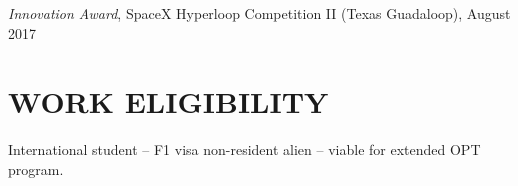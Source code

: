 \documentclass[11pt]{res}
\begin{document}
\begin{resume}
	\textit{Innovation Award}, SpaceX Hyperloop Competition II (Texas Guadaloop), August 2017

\vspace{-12pt}
\section{WORK ELIGIBILITY}
        \vspace{0pt}
	International student {}-- F1 visa non-resident alien {}-- viable for extended OPT program.  

\end{resume}
\end{document}
